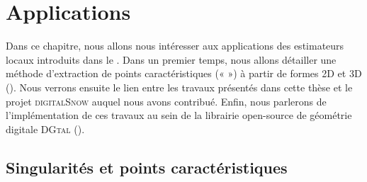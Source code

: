 %
\chapter{Applications}
\label{sec:applications}


\setcounter{minitocdepth}{3}
\minitoc

\newpage

%

Dans ce chapitre, nous allons nous intéresser aux applications des estimateurs
locaux introduits dans le . Dans un premier temps,
nous allons détailler une méthode d'extraction de points caractéristiques («
 ») à partir de formes 2D et 3D
().
%
%
Nous verrons ensuite le lien entre les travaux présentés dans cette thèse et le
projet \textsc{digitalSnow} auquel nous avons contribué. Enfin, nous parlerons
de l'implémentation de ces travaux au sein de la librairie open-source de
géométrie digitale \textsc{DGtal} \cite{DGtal}
().
%
\section{Singularités et points caractéristiques}%
\label{sec:applications:feature}
%
